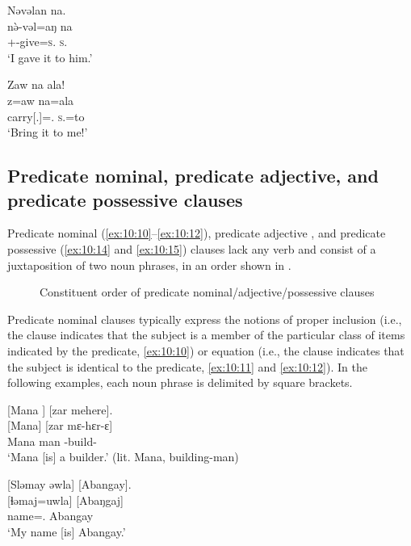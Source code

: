\ea \label{ex:10:8}
Nəvəlan  na.\\
\gll  n\`{ə}-vəl=aŋ    na\\
      {\oneS}+{\PFV}-give=\textsc{s}.{\IO}  \textsc{s}.{\DO}\\
\glt  ‘I gave it to him.’
\z

\ea \label{ex:10:9}
Zaw  na  ala!\\
\gll  z=aw   na=ala\\
      carry[{\twoS}.{\IMP}]={\oneS}.{\IO}  \textsc{s}.{\DO}=to\\
\glt  ‘Bring it to me!’
\z

\subsection{Predicate nominal, predicate adjective, and predicate possessive clauses}\label{sec:10.1.2}
\hypertarget{RefHeading1212881525720847}{}
Predicate nominal (\ref{ex:10:10}--\ref{ex:10:12}), predicate adjective , and predicate possessive (\ref{ex:10:14} and \ref{ex:10:15}) clauses lack any verb and consist of a juxtaposition of two noun phrases, in an order shown in .

\begin{figure}
\caption{Constituent order of predicate nominal\slash adjective\slash possessive clauses}\label{fig:17}
\end{figure}

Predicate nominal clauses typically express the notions of proper inclusion (i.e., the clause indicates that the subject is a member of the particular class of items indicated by the predicate, \ref{ex:10:10}) or equation (i.e., the clause indicates that the subject is identical to the predicate, \ref{ex:10:11} and \ref{ex:10:12}). In the following examples, each noun phrase is delimited by square brackets.

\ea \label{ex:10:10}
{} [Mana ]  [zar  mehere].\\
\gll  {}[Mana]    [zar  mɛ-hɛr-ɛ]\\
      Mana    man  {\NOM}{}-build-{\CL}\\
\glt  ‘Mana [is] a builder.’ (lit. Mana, building-man)
\z

\ea \label{ex:10:11}
{}[Sləmay  əwla]  [Abangay].\\
\gll  {}[ɬəmaj=uwla]  [Abaŋgaj]\\
      name={\oneS}.{\POSS}  Abangay\\
\glt  ‘My name [is] Abangay.’
\z


